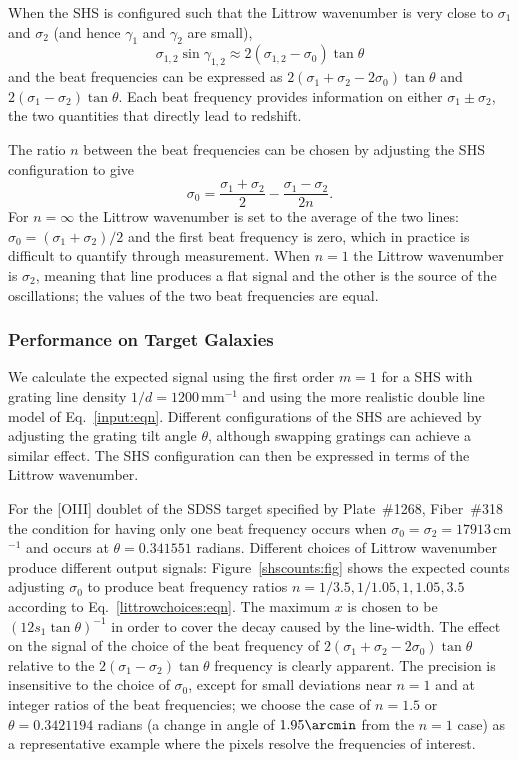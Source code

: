 \documentclass[preprint2, 10pt]{aastex}
\begin{document}
When the SHS is configured such that the Littrow wavenumber is
very close to $\sigma_1$ and $\sigma_2$ (and hence $\gamma_1$ and $\gamma_2$
are small),
\begin{equation}
\sigma_{1,2}\sin{\gamma_{1,2}} \approx  2(\sigma_{1,2}-\sigma_0) \tan{\theta}
\end{equation}
and the beat frequencies can be expressed as
$2(\sigma_1+\sigma_2-2\sigma_0)\tan{\theta}$ and $2(\sigma_1-\sigma_2)\tan{\theta}$.
Each beat frequency provides information on either 
$\sigma_1\pm \sigma_2$, the two quantities that directly lead to redshift.

The ratio $n$ between the beat frequencies can be chosen by adjusting the SHS configuration to give
\begin{equation}
\sigma_0=\frac{\sigma_1+\sigma_2}{2}-\frac{\sigma_1-\sigma_2}{2n}.
\label{littrowchoices:eqn}
\end{equation}
For $n=\infty$  the Littrow wavenumber is set to the average of the two lines: $\sigma_0=(\sigma_1+\sigma_2)/2$ and the first beat frequency is zero,
which in practice is difficult to quantify through measurement.  When $n=1$ the Littrow wavenumber is $\sigma_2$, meaning that line produces a flat signal and the other is the source
of the oscillations; the values of the two beat frequencies are equal.


\subsubsection{Performance on Target Galaxies}

We calculate the expected signal using the first order $m=1$ for a SHS with grating line density $1/d=1200$\,mm$^{-1}$
and using the more realistic double line model of Eq.~\ref{input:eqn}. 
Different configurations of the SHS are achieved by adjusting the grating tilt angle $\theta$, although swapping
gratings can achieve a similar effect.
The SHS configuration can then be expressed in terms of the Littrow wavenumber.

For the [OIII] doublet of the
SDSS target specified by Plate~\#1268, Fiber~\#318 
the condition for having only one beat frequency occurs when $\sigma_0=\sigma_2=17913$\,cm$^{-1}$ and
occurs at $\theta=0.341551$ radians.
Different choices of Littrow wavenumber
produce different output signals:
Figure~\ref{shscounts:fig} shows the expected counts adjusting $\sigma_0$ to produce beat frequency ratios
$n=1/3.5,1/1.05,1,1.05,3.5$ according to Eq.~\ref{littrowchoices:eqn}.
The maximum $x$ is chosen to be $(12s_1\tan{\theta})^{-1}$ in order to cover the decay caused by the line-width.
The effect on the signal
of the choice of the beat frequency of $2(\sigma_1+\sigma_2-2\sigma_0)\tan{\theta}$ relative to the $2(\sigma_1-\sigma_2)\tan{\theta}$ frequency
is clearly apparent.
The precision is insensitive to the choice of $\sigma_0$, except
for small deviations near $n=1$ and at integer ratios of the beat frequencies; we choose
the case of $n=1.5$ or $\theta = 0.3421194$ radians (a change in angle of $1.95 \arcmin$ from the $n=1$ case)
as a representative example where the pixels resolve the frequencies of interest.
\end{document}
